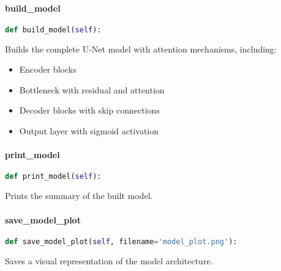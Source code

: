 \documentclass{article}
\begin{document}
	\paragraph{build\_model}
	\begin{lstlisting}[language=Python]
		def build_model(self):
	\end{lstlisting}
	Builds the complete U-Net model with attention mechanisms, including:
	\begin{itemize}
		\item Encoder blocks
		\item Bottleneck with residual and attention
		\item Decoder blocks with skip connections
		\item Output layer with sigmoid activation
	\end{itemize}
	
	\paragraph{print\_model}
	\begin{lstlisting}[language=Python]
		def print_model(self):
	\end{lstlisting}
	Prints the summary of the built model.
	
	\paragraph{save\_model\_plot}
	\begin{lstlisting}[language=Python]
		def save_model_plot(self, filename='model_plot.png'):
	\end{lstlisting}
	Saves a visual representation of the model architecture.
	
	
	
	
\end{document}
